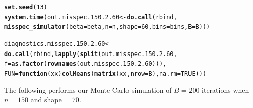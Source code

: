 \documentclass[11pt]{article}\usepackage[]{graphicx}\usepackage[]{color}
\makeatletter
\newcommand{\hlnum}[1]{\textcolor[rgb]{0.686,0.059,0.569}{#1}}%
\newcommand{\hlstd}[1]{\textcolor[rgb]{0.345,0.345,0.345}{#1}}%
\newcommand{\hlkwa}[1]{\textcolor[rgb]{0.161,0.373,0.58}{\textbf{#1}}}%
\newcommand{\hlkwb}[1]{\textcolor[rgb]{0.69,0.353,0.396}{#1}}%
\newcommand{\hlkwc}[1]{\textcolor[rgb]{0.333,0.667,0.333}{#1}}%
\newcommand{\hlkwd}[1]{\textcolor[rgb]{0.737,0.353,0.396}{\textbf{#1}}}%
\newenvironment{kframe}{%
 \def\at@end@of@kframe{}%
 \ifinner\ifhmode%
  \def\at@end@of@kframe{\end{minipage}}%
  \begin{minipage}{\columnwidth}%
 \fi\fi%
 \def\FrameCommand##1{\hskip\@totalleftmargin \hskip-\fboxsep
 \colorbox{shadecolor}{##1}\hskip-\fboxsep
     \hskip-\linewidth \hskip-\@totalleftmargin \hskip\columnwidth}%
 \MakeFramed {\advance\hsize-\width
   \@totalleftmargin\z@ \linewidth\hsize
   \@setminipage}}%
 {\par\unskip\endMakeFramed%
 \at@end@of@kframe}
\newenvironment{knitrout}{}{} %
\makeatother
\begin{document}
\begin{knitrout}
\color{fgcolor}\begin{kframe}
\begin{alltt}
\hlkwd{set.seed}\hlstd{(}\hlnum{13}\hlstd{)}
\hlkwd{system.time}\hlstd{(out.misspec.150.2.60} \hlkwb{<-} \hlkwd{do.call}\hlstd{(rbind,}
  \hlkwd{misspec_simulator}\hlstd{(}\hlkwc{beta} \hlstd{= beta,} \hlkwc{n} \hlstd{= n,} \hlkwc{shape} \hlstd{=} \hlnum{60}\hlstd{,} \hlkwc{bins} \hlstd{= bins,} \hlkwc{B} \hlstd{= B)))}
\end{alltt}


{\ttfamily\noindent\bfseries\color{errorcolor}{\#\# Error in chol.default(crossprod(x) + lambda[j] * diag(v)): the leading minor of order 5 is not positive definite}}

{\ttfamily\noindent\itshape\color{messagecolor}{\#\# Timing stopped at: 0.717 0 0.717}}\begin{alltt}
\hlstd{diagnostics.misspec.150.2.60} \hlkwb{<-} \hlkwd{do.call}\hlstd{(rbind,} \hlkwd{lapply}\hlstd{(}\hlkwd{split}\hlstd{(out.misspec.150.2.60,}
  \hlkwc{f} \hlstd{=} \hlkwd{as.factor}\hlstd{(}\hlkwd{rownames}\hlstd{(out.misspec.150.2.60))),}
  \hlkwc{FUN} \hlstd{=} \hlkwa{function}\hlstd{(}\hlkwc{xx}\hlstd{)} \hlkwd{colMeans}\hlstd{(}\hlkwd{matrix}\hlstd{(xx,} \hlkwc{nrow} \hlstd{= B),} \hlkwc{na.rm} \hlstd{=} \hlnum{TRUE}\hlstd{)))}
\end{alltt}


{\ttfamily\noindent\bfseries\color{errorcolor}{\#\# Error in split(out.misspec.150.2.60, f = as.factor(rownames(out.misspec.150.2.60))): object 'out.misspec.150.2.60' not found}}\end{kframe}
\end{knitrout}


The following performs our Monte Carlo simulation of $B = 200$ iterations 
when $n = 150$ and shape = $70$.
\end{document}
